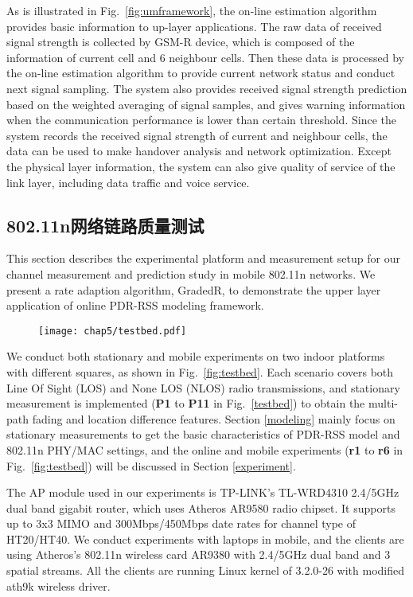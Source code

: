 As is illustrated in Fig.~\ref{fig:umframework}, the on-line estimation algorithm provides basic information to up-layer applications. The raw data of received signal strength is collected by GSM-R device, which is composed of the information of current cell and 6 neighbour cells. Then these data is processed by the on-line estimation algorithm to provide current network status and conduct next signal sampling. The system also provides received signal strength prediction based on the weighted averaging of signal samples, and gives warning information when the communication performance is lower than certain threshold. Since the system records the received signal strength of current and neighbour cells, the data can be used to make handover analysis and network optimization. Except the physical layer information, the system can also give quality of service of the link layer, including data traffic and voice service.

\subsection{802.11n网络链路质量测试}
\label{sec:80211n}

This section describes the experimental platform and measurement setup for our channel measurement and prediction study in mobile 802.11n networks. We present a rate adaption algorithm, GradedR, to demonstrate the upper layer application of online PDR-RSS modeling framework.

\begin{figure}[!htp]
\centering
\texttt{[image: chap5/testbed.pdf]}
\end{figure}

We conduct both stationary and mobile experiments on two indoor platforms with different squares, as shown in Fig.~\ref{fig:testbed}. Each scenario covers both Line Of Sight (LOS) and None LOS (NLOS) radio transmissions, and stationary measurement is implemented (\textbf{P1} to \textbf{P11} in Fig.~\ref{testbed}) to obtain the multi-path fading and location difference features. Section \ref{modeling} mainly focus on stationary measurements to get the basic characteristics of PDR-RSS model and 802.11n PHY/MAC settings, and the online and mobile experiments (\textbf{r1} to \textbf{r6} in Fig.~\ref{fig:testbed}) will be discussed in Section \ref{experiment}.

The AP module used in our experiments is TP-LINK's TL-WRD4310 2.4/5GHz dual band gigabit router, which uses Atheros AR9580 radio chipset. It supports up to 3x3 MIMO and 300Mbps/450Mbps date rates for channel type of HT20/HT40. We conduct experiments with laptops in mobile, and the clients are using Atheros's 802.11n wireless card AR9380 with 2.4/5GHz dual band and 3 spatial streams. All the clients are running Linux kernel of 3.2.0-26 with modified ath9k wireless driver.

